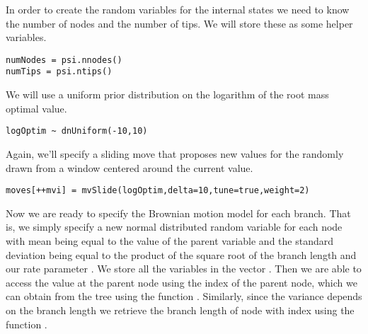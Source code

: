 In order to create the random variables for the internal states we need to know the number of nodes and the number of tips.
We will store these as some helper variables.
{\tt \small \begin{snugshade*}
\begin{lstlisting}
numNodes = psi.nnodes()
numTips = psi.ntips()
\end{lstlisting}
\end{snugshade*}}

We will use a uniform prior distribution on the logarithm of the root mass optimal value.
{\tt \small \begin{snugshade*}
\begin{lstlisting}
logOptim ~ dnUniform(-10,10)
\end{lstlisting}
\end{snugshade*}}
Again, we'll specify a sliding move that proposes new values for the  randomly drawn from a window centered around the current value.
{\tt \small \begin{snugshade*}
\begin{lstlisting}
moves[++mvi] = mvSlide(logOptim,delta=10,tune=true,weight=2)
\end{lstlisting}
\end{snugshade*}}

Now we are ready to specify the Brownian motion model for each branch.
That is, we simply specify a new normal distributed random variable for each node with mean being equal to the value of the parent variable and the standard deviation being equal to the product of the square root of the branch length and our rate parameter . We store all the variables in the vector . Then we are able to access the value at the parent node using the index of the parent node, which we can obtain from the tree using the function . Similarly, since the variance depends on the branch length we retrieve the branch length of node with index  using the function .

